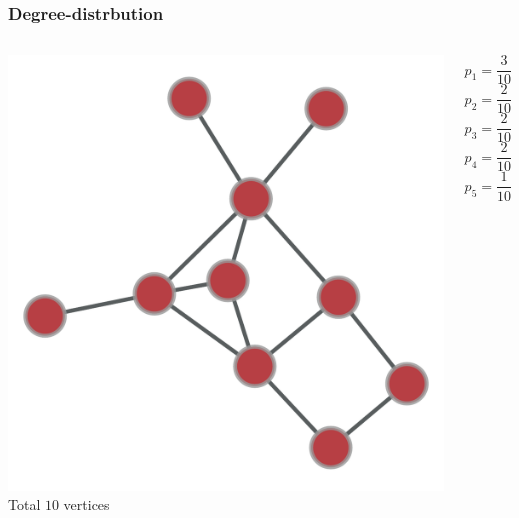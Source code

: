 \documentclass{beamer}
\begin{document}
\begin{frame}
    \frametitle{Degree-distrbution}
    \begin{columns}
        \centering
        \includegraphics[width=\columnwidth]{small_graph.pdf}
        \centering
        Total $10$ vertices

        $$p_{1} = \frac{3}{10}$$
        $$p_{2} = \frac{2}{10}$$
        $$p_{3} = \frac{2}{10}$$
        $$p_{4} = \frac{2}{10}$$
        $$p_{5} = \frac{1}{10}$$
    \end{columns}
\end{frame}
\end{document}

